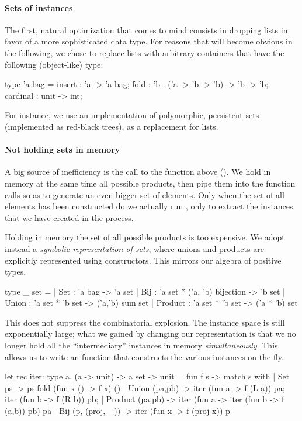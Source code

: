 \paragraph{Sets of instances}
The first, natural optimization that comes to mind consists in
dropping lists in favor of a more sophisticated data type. For reasons
that will become obvious in the following, we chose to replace lists
with arbitrary containers that have the following (object-like) type:
\begin{ocamlcode}
type 'a bag = {
  insert : 'a -> 'a bag;
  fold : 'b . ('a -> 'b -> 'b) -> 'b -> 'b;
  cardinal : unit -> int; }
\end{ocamlcode}
For instance, we use an implementation of polymorphic, persistent sets
(implemented as red-black trees), as a replacement for lists.

\paragraph{Not holding sets in memory}
A big source of inefficiency is the call to the
 function above (). We hold in memory
at the same time all possible products, then pipe them into the function calls
so as to generate an even bigger set of elements. Only when the set of all
elements has been constructed do we actually run , only to
extract the instances that we have created in the process.

Holding in memory the set of all possible products is too expensive. We adopt
instead a \emph{symbolic representation of sets}, where unions and products are
explicitly represented using constructors. This mirrors our algebra of positive
types.
%
\begin{ocamlcode}
type _ set =
  | Set   : 'a bag -> 'a set
  | Bij   : 'a set * ('a, 'b) bijection -> 'b set
  | Union   : 'a set * 'b set -> ('a,'b) sum set
  | Product : 'a set * 'b set -> ('a * 'b) set
\end{ocamlcode}
%
This does not suppress the combinatorial explosion. The instance space is still
exponentially large; what we gained by changing our representation is that we
no longer hold all the ``intermediary'' instances in memory
\emph{simultaneously}. This allows us to write an  function that
constructs the various instances on-the-fly.
%
\begin{ocamlcode}
let rec iter: type a. (a -> unit) -> a set -> unit =
fun f s -> match s with
  | Set ps -> ps.fold (fun x () -> f x) ()
  | Union (pa,pb) ->
      iter (fun a -> f (L a)) pa;
      iter (fun b -> f (R b)) pb;
  | Product (pa,pb) ->
      iter (fun a -> iter (fun b -> f (a,b)) pb) pa
  | Bij (p, (proj, _)) -> iter (fun x -> f (proj x)) p
\end{ocamlcode}
%

